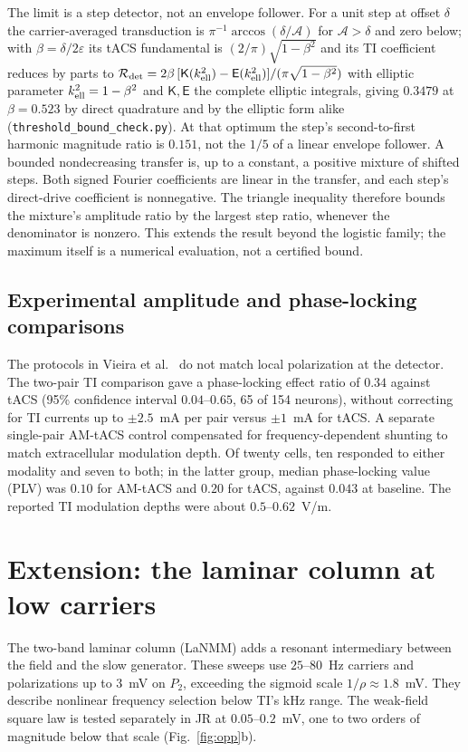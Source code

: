 \documentclass[11pt,a4paper]{article}
\begin{document}
The limit is a step detector, not an envelope follower. For a unit step at offset
$\delta$ the carrier-averaged transduction is $\pi^{-1}\arccos(\delta/\mathcal A)$ for $\mathcal A>\delta$
and zero below; with $\beta=\delta/2\varepsilon$ its tACS fundamental is
$(2/\pi)\sqrt{1-\beta^2}$ and its TI coefficient reduces by parts to
$\mathcal R_{\rm det}=2\beta\,[\mathsf K(k_{\rm ell}^2)-\mathsf E(k_{\rm ell}^2)]/(\pi\sqrt{1-\beta^2})$
with elliptic parameter $k_{\rm ell}^2=1-\beta^2$ and $\mathsf K,\mathsf E$
the complete elliptic integrals, giving $0.3479$ at $\beta=0.523$ by direct quadrature and
by the elliptic form alike (\texttt{threshold\_bound\_check.py}). At that optimum the
step's second-to-first harmonic magnitude ratio is $0.151$, not the $1/5$ of a linear
envelope follower. A bounded nondecreasing transfer is, up to a constant, a positive
mixture of shifted steps. Both signed Fourier coefficients are linear in the
transfer, and each step's direct-drive coefficient is nonnegative. The triangle
inequality therefore bounds the mixture's amplitude ratio by the largest step
ratio, whenever the denominator is nonzero. This extends the result beyond the
logistic family; the maximum itself is a numerical evaluation, not a certified bound.

\subsection{Experimental amplitude and phase-locking comparisons}\label{supp:vieira}
The protocols in Vieira et al.\ \cite{vieira2024} do not match local polarization at the detector.
The two-pair TI comparison gave a phase-locking effect ratio of $0.34$ against
tACS (95\% confidence interval $0.04$--$0.65$, 65 of 154 neurons), without
correcting for TI currents up to $\pm2.5$~mA per pair versus $\pm1$~mA for tACS.
A separate single-pair AM-tACS control compensated for frequency-dependent
shunting to match extracellular modulation depth. Of twenty cells, ten responded
to either modality and seven to both; in the latter group, median phase-locking
value (PLV) was $0.10$ for AM-tACS and $0.20$ for tACS, against $0.043$ at baseline.
The reported TI modulation depths were about $0.5$--$0.62$~V/m.


\section{Extension: the laminar column at low carriers}\label{app:lanmm}
The two-band laminar column (LaNMM) adds a resonant intermediary
between the field and the slow generator. These sweeps use $25$--$80$~Hz carriers
and polarizations up to $3$~mV on $P_2$, exceeding the sigmoid scale
$1/\rho\approx1.8$~mV. They describe nonlinear frequency selection below TI's
kHz range. The weak-field square law is tested separately in JR at
$0.05$--$0.2$~mV, one to two orders of magnitude below that scale
(Fig.~\ref{fig:opp}b).
\end{document}

